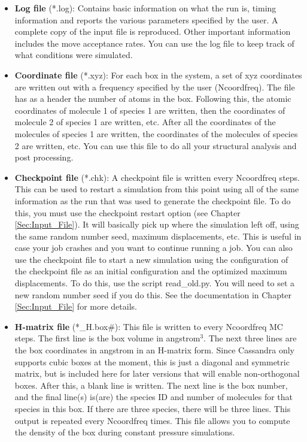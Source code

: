 \begin{itemize}

\item {\bf Log file} (*.log): Contains basic information on what the run is, timing information and reports the various parameters specified by the user. A complete copy of the input file is reproduced. Other important information includes the move acceptance rates. You can use the log file to keep track of what conditions were simulated.

\item {\bf Coordinate file} (*.xyz): For each box in the system, a set of xyz coordinates are written out with a frequency specified by the user (Ncoordfreq). The file has as a header the number of atoms in the box. Following this, the atomic coordinates of molecule 1 of species 1 are written, then the coordinates of molecule 2 of species 1 are written, etc. After all the coordinates of the molecules of species 1 are written, the coordinates of the molecules of species 2 are written, etc. You can use this file to do all your structural analysis and post processing.

\item {\bf Checkpoint file} (*.chk): A checkpoint file is written every Ncoordfreq steps. This can be used to restart a simulation from this point using all of the same information as the run that was used to generate the checkpoint file. To do this, you must use the checkpoint restart option (see Chapter \ref{Sec:Input_File}). It will basically pick up where the simulation left off, using the same random number seed, maximum displacements, etc. This is useful in case your job crashes and you want to continue running a job. You can also use the checkpoint file to start a new simulation using the  configuration of the checkpoint file as an initial configuration and the optimized maximum displacements.  To do this, use the script read\_old.py. You will need to set a new random number seed if you do this. See the documentation in Chapter \ref{Sec:Input_File} for more details.

\item {\bf H-matrix file} (*\_H.box\#): This file is written to every Ncoordfreq MC steps. The first line is the box volume in angstrom$^3$. The next three lines are the box coordinates in angstrom in an H-matrix form. Since Cassandra only supports cubic boxes at the moment, this is just a diagonal and symmetric matrix, but is included here for later versions that will enable non-orthogonal boxes. After this, a blank line is written. The next line is the box number, and the final line(s) is(are) the species ID and number of molecules for that species in this box. If there are three species, there will be three lines. This output is repeated every Ncoordfreq times. This file allows you to compute the density of the box during constant pressure simulations.  


\end{itemize}

